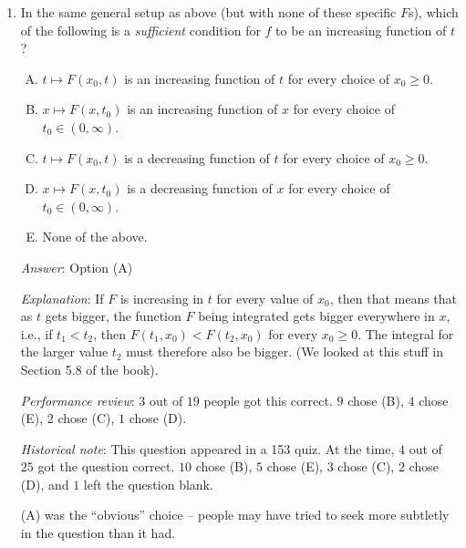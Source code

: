 \documentclass[10pt]{amsart}
\begin{document}
\begin{enumerate}
  {\em Historical note}: This question appeared in a 153 quiz. At the
  time, $12$ out of $25$ people got the question correct. $6$ chose
  (E), $3$ chose (C), $2$ each chose (A) and (B).

\item In the same general setup as above (but with none of these
  specific $F$s), which of the following is a {\em sufficient}
  condition for $f$ to be an increasing function of $t$?

  \begin{enumerate}[(A)]
  \item $t \mapsto F(x_0,t)$ is an increasing function of $t$ for
    every choice of $x_0 \ge 0$.
  \item $x \mapsto F(x,t_0)$ is an increasing function of $x$ for
    every choice of $t_0 \in (0,\infty)$.
  \item $t \mapsto F(x_0,t)$ is a decreasing function of $t$ for
    every choice of $x_0 \ge 0$.
  \item $x \mapsto F(x,t_0)$ is a decreasing function of $x$ for
  every choice of $t_0 \in (0,\infty)$.
  \item None of the above.
  \end{enumerate}

  {\em Answer}: Option (A)

  {\em Explanation}: If $F$ is increasing in $t$ for every value of
  $x_0$, then that means that as $t$ gets bigger, the function $F$
  being integrated gets bigger everywhere in $x$, i.e., if $t_1 <
  t_2$, then $F(t_1,x_0) < F(t_2,x_0)$ for every $x_0 \ge 0$. The
  integral for the larger value $t_2$ must therefore also be
  bigger. (We looked at this stuff in Section 5.8 of the book).

  {\em Performance review}: $3$ out of $19$ people got this
  correct. $9$ chose (B), $4$ chose (E), $2$ chose (C), $1$ chose (D).

  {\em Historical note}: This question appeared in a 153 quiz. At the
  time, $4$ out of $25$ got the question correct. $10$ chose (B), $5$
  chose (E), $3$ chose (C), $2$ chose (D), and $1$ left the question
  blank.

  (A) was the ``obvious'' choice -- people may have tried to seek more
  subtletly in the question than it had.


\end{enumerate}
\end{document}
